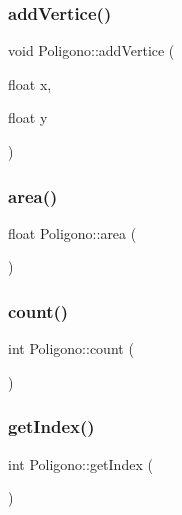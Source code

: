 \subsubsection{\texorpdfstring{add\+Vertice()}{addVertice()}}
{\footnotesize\ttfamily void Poligono\+::add\+Vertice (\begin{DoxyParamCaption}\item[{float}]{x,  }\item[{float}]{y }\end{DoxyParamCaption})}

\mbox{\label{class_poligono_a7f66c446f86c19118663ef1b2c8a4be6}} 
\subsubsection{\texorpdfstring{area()}{area()}}
{\footnotesize\ttfamily float Poligono\+::area (\begin{DoxyParamCaption}{ }\end{DoxyParamCaption})}

\mbox{\label{class_poligono_ae4022d848bf0c3a4d4e3868ae4402250}} 
\subsubsection{\texorpdfstring{count()}{count()}}
{\footnotesize\ttfamily int Poligono\+::count (\begin{DoxyParamCaption}{ }\end{DoxyParamCaption})}

\mbox{\label{class_poligono_a84ebaf60416645892d91d1eb171e0442}} 
\subsubsection{\texorpdfstring{get\+Index()}{getIndex()}}
{\footnotesize\ttfamily int Poligono\+::get\+Index (\begin{DoxyParamCaption}{ }\end{DoxyParamCaption})}

\mbox{\label{class_poligono_a44c44b946558ffd10179d101bb9017ec}} 
